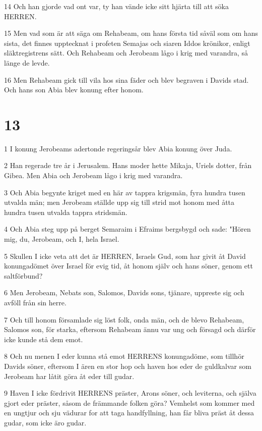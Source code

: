 \par 14 Och han gjorde vad ont var, ty han vände icke sitt hjärta till att söka HERREN.
\par 15 Men vad som är att säga om Rehabeam, om hans första tid såväl som om hans sista, det finnes upptecknat i profeten Semajas och siaren Iddos krönikor, enligt släktregistrens sätt. Och Rehabeam och Jerobeam lågo i krig med varandra, så länge de levde.
\par 16 Men Rehabeam gick till vila hos sina fäder och blev begraven i Davids stad. Och hans son Abia blev konung efter honom.

\chapter{13}

\par 1 I konung Jerobeams adertonde regeringsår blev Abia konung över Juda.
\par 2 Han regerade tre år i Jerusalem. Hans moder hette Mikaja, Uriels dotter, från Gibea. Men Abia och Jerobeam lågo i krig med varandra.
\par 3 Och Abia begynte kriget med en här av tappra krigsmän, fyra hundra tusen utvalda män; men Jerobeam ställde upp sig till strid mot honom med åtta hundra tusen utvalda tappra stridsmän.
\par 4 Och Abia steg upp på berget Semaraim i Efraims bergsbygd och sade: "Hören mig, du, Jerobeam, och I, hela Israel.
\par 5 Skullen I icke veta att det är HERREN, Israels Gud, som har givit åt David konungadömet över Israel för evig tid, åt honom själv och hans söner, genom ett saltförbund?
\par 6 Men Jerobeam, Nebats son, Salomos, Davids sons, tjänare, uppreste sig och avföll från sin herre.
\par 7 Och till honom församlade sig löst folk, onda män, och de blevo Rehabeam, Salomos son, för starka, eftersom Rehabeam ännu var ung och försagd och därför icke kunde stå dem emot.
\par 8 Och nu menen I eder kunna stå emot HERRENS konungadöme, som tillhör Davids söner, eftersom I ären en stor hop och haven hos eder de guldkalvar som Jerobeam har låtit göra åt eder till gudar.
\par 9 Haven I icke fördrivit HERRENS präster, Arons söner, och leviterna, och själva gjort eder präster, såsom de främmande folken göra? Vemhelst som kommer med en ungtjur och sju vädurar for att taga handfyllning, han får bliva präst åt dessa gudar, som icke äro gudar.
